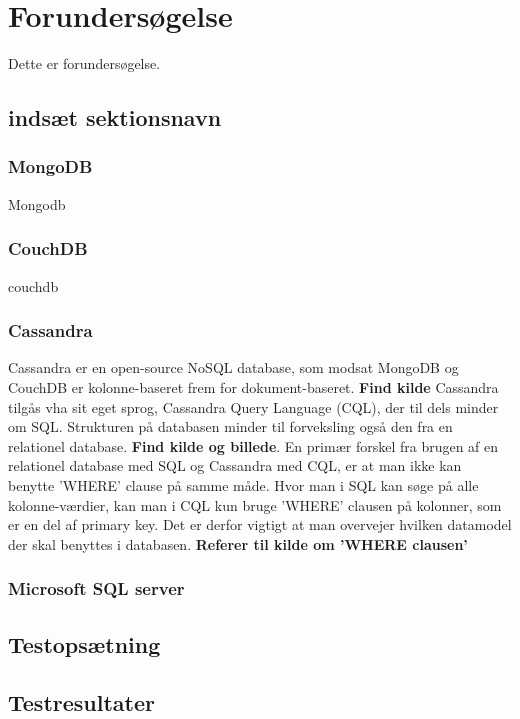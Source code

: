 \section{Forundersøgelse}
Dette er forundersøgelse.

\subsection{indsæt sektionsnavn}

\subsubsection{MongoDB}
Mongodb
\subsubsection{CouchDB}
couchdb
\subsubsection{Cassandra}
Cassandra er en open-source NoSQL database, som modsat MongoDB og CouchDB er kolonne-baseret frem for dokument-baseret. \textbf{Find kilde} \newline 
Cassandra tilgås vha sit eget sprog, Cassandra Query Language (CQL), der til dels minder om SQL. Strukturen på databasen minder til forveksling også den fra en relationel database. \textbf{Find kilde og billede}. \newline
En primær forskel fra brugen af en relationel database med SQL og Cassandra med CQL, er at man ikke kan benytte 'WHERE' clause på samme måde. Hvor man i SQL kan søge på alle kolonne-værdier, kan man i CQL kun bruge 'WHERE' clausen på kolonner, som er en del af primary key. Det er derfor vigtigt at man overvejer hvilken datamodel der skal benyttes i databasen. \textbf{Referer til kilde om 'WHERE clausen'}

\subsubsection{Microsoft SQL server}

\subsection{Testopsætning}

\subsection{Testresultater}